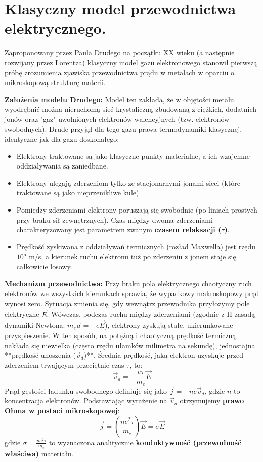 \documentclass[11pt, a4paper]{article}
\begin{document}
\section{Klasyczny model przewodnictwa elektrycznego.}

Zaproponowany przez Paula Drudego na początku XX wieku (a następnie rozwijany przez Lorentza) klasyczny model gazu elektronowego stanowił pierwszą próbę zrozumienia zjawiska przewodnictwa prądu w metalach w oparciu o mikroskopową strukturę materii.

\textbf{Założenia modelu Drudego:}
Model ten zakłada, że w objętości metalu wyodrębnić można nieruchomą sieć krystaliczną zbudowaną z ciężkich, dodatnich jonów oraz "gaz" uwolnionych elektronów walencyjnych (tzw. elektronów swobodnych). Drude przyjął dla tego gazu prawa termodynamiki klasycznej, identyczne jak dla gazu doskonałego:
\begin{itemize}
    \item Elektrony traktowane są jako klasyczne punkty materialne, a ich wzajemne oddziaływania są zaniedbane.
    \item Elektrony ulegają zderzeniom tylko ze stacjonarnymi jonami sieci (które traktowane są jako nieprzenikliwe kule).
    \item Pomiędzy zderzeniami elektrony poruszają się swobodnie (po liniach prostych przy braku sił zewnętrznych). Czas między dwoma zderzeniami charakteryzowany jest parametrem zwanym \textbf{czasem relaksacji ($\tau$)}.
    \item Prędkość zyskiwana z oddziaływań termicznych (rozład Maxwella) jest rzędu $10^5$ m/s, a kierunek ruchu elektronu tuż po zderzeniu z jonem staje się całkowicie losowy.
\end{itemize}

\textbf{Mechanizm przewodnictwa:}
Przy braku pola elektrycznego chaotyczny ruch elektronów we wszystkich kierunkach sprawia, że wypadkowy makroskopowy prąd wynosi zero. Sytuacja zmienia się, gdy wewnątrz przewodnika przyłożymy pole elektryczne $\vec{E}$. Wówczas, podczas ruchu między zderzeniami (zgodnie z II zasadą dynamiki Newtona: $m_e \vec{a} = -e\vec{E}$), elektrony zyskują stałe, ukierunkowane przyspieszenie. W ten sposób, na potężną i chaotyczną prędkość termiczną nakłada się niewielka (często rzędu ułamków milimetra na sekundę), jednostajna **prędkość unoszenia ($\vec{v}_d$)**.
Średnia prędkość, jaką elektron uzyskuje przed zderzeniem trwającym przeciętnie czas $\tau$, to:
\[
\vec{v}_d = -\frac{e\tau}{m_e} \vec{E}
\]
Prąd gęstości ładunku swobodnego definiuje się jako $\vec{j} = -n e \vec{v}_d$, gdzie $n$ to koncentracja elektronów. Podstawiając wyrażenie na $\vec{v}_d$ otrzymujemy \textbf{prawo Ohma w postaci mikroskopowej}:
\[
\vec{j} = \left(\frac{n e^2 \tau}{m_e}\right) \vec{E} = \sigma \vec{E}
\]
gdzie $\sigma = \frac{n e^2 \tau}{m_e}$ to wyznaczona analitycznie \textbf{konduktywność (przewodność właściwa)} materiału.
\end{document}
